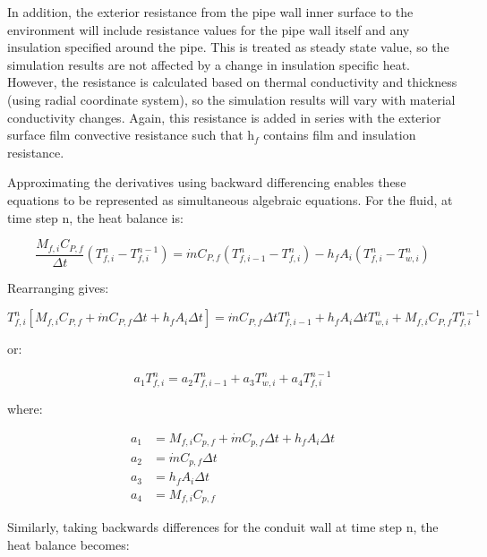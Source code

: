 In addition, the exterior resistance from the pipe wall inner surface to the environment will include resistance values for the pipe wall itself and any insulation specified around the pipe. This is treated as steady state value, so the simulation results are not affected by a change in insulation specific heat. However, the resistance is calculated based on thermal conductivity and thickness (using radial coordinate system), so the simulation results will vary with material conductivity changes. Again, this resistance is added in series with the exterior surface film convective resistance such that h\(_{f}\) contains film and insulation resistance.

Approximating the derivatives using backward differencing enables these equations to be represented as simultaneous algebraic equations. For the fluid, at time step n, the heat balance is:

\begin{equation}
\frac{{{M_{f,i}}{C_{P,f}}}}{{\Delta t}}\left( {T_{f,i}^n - T_{f,i}^{n - 1}} \right) = \dot m{C_{P,f}}\left( {T_{f,i - 1}^n - T_{f,i}^n} \right) - {h_f}{A_i}\left( {T_{f,i}^n - T_{w,i}^n} \right)
\end{equation}

Rearranging gives:

\begin{equation}
T_{f,i}^n\left[ {{M_{f,i}}{C_{P,f}} + \dot m{C_{P,f}}\Delta t + {h_f}{A_i}\Delta t} \right] = \dot m{C_{P,f}}\Delta tT_{f,i - 1}^n + {h_f}{A_i}\Delta tT_{w,i}^n + {M_{f,i}}{C_{P,f}}T_{f,i}^{n - 1}
\end{equation}

or:

\begin{equation}
{a_1}T_{f,i}^n = {a_2}T_{f,i - 1}^n + {a_3}T_{w,i}^n + {a_4}T_{f,i}^{n - 1}
\label{eq:PipeEquation614}
\end{equation}

where:

\begin{equation}
  \begin{array}{rl}
    a_1 &= M_{f,i}C_{p,f} + \dot{m}C_{p,f} \Delta t + h_f A_i \Delta t \\
    a_2 &= \dot{m} C_{p,f} \Delta t \\
    a_3 &= h_f A_i \Delta t \\
    a_4 &= M_{f,i} C_{p,f}
  \end{array}
\end{equation}

Similarly, taking backwards differences for the conduit wall at time step n, the heat balance becomes:


